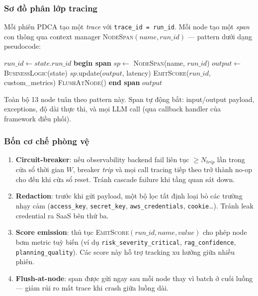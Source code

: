 \subsubsection*{Sơ đồ phân lớp tracing}
Mỗi phiên PDCA tạo một \textit{trace} với \texttt{trace\_id = run\_id}. Mỗi node tạo một \textit{span} con thông qua context manager \textsc{NodeSpan}$(\textit{name}, \textit{run\_id})$ — pattern dưới dạng pseudocode:

\begin{algorithmic}[1]
    \State $run\_id \gets state.run\_id$
    \State \textbf{begin span} $sp \gets$ \textsc{NodeSpan}(name, $run\_id$)
    \State $output \gets$ \textsc{BusinessLogic}(state)
    \State $sp$.update($output$, latency)
    \State \textsc{EmitScore}($run\_id$, custom\_metrics)
    \State \textsc{FlushAtNode}() 
    \State \textbf{end span}
    \State \Return $output$
  \EndFunction
\end{algorithmic}

Toàn bộ 13 node tuân theo pattern này. Span tự động bắt: input/output payload, exceptions, độ dài thực thi, và mọi LLM call (qua callback handler của framework điều phối).

\subsubsection*{Bốn cơ chế phòng vệ}
\begin{enumerate}
  \item \textbf{Circuit-breaker}: nếu observability backend fail liên tục $\geq N_{trip}$ lần trong cửa sổ thời gian $W$, breaker \textit{trip} và mọi call tracing tiếp theo trở thành no-op cho đến khi cửa sổ reset. Tránh cascade failure khi tầng quan sát down.
  \item \textbf{Redaction}: trước khi gửi payload, một bộ lọc tất định loại bỏ các trường nhạy cảm (\texttt{access\_key}, \texttt{secret\_key}, \texttt{aws\_credentials}, \texttt{cookie}\ldots). Tránh leak credential ra SaaS bên thứ ba.
  \item \textbf{Score emission}: thủ tục \textsc{EmitScore}$(run\_id, name, value)$ cho phép node bơm metric tuỳ biến (ví dụ \texttt{risk\_severity\_critical}, \texttt{rag\_confidence}, \texttt{planning\_quality}). Các score này hỗ trợ tracking xu hướng giữa nhiều phiên.
  \item \textbf{Flush-at-node}: span được gửi ngay sau mỗi node thay vì batch ở cuối luồng — giảm rủi ro mất trace khi crash giữa luồng dài.
\end{enumerate}

